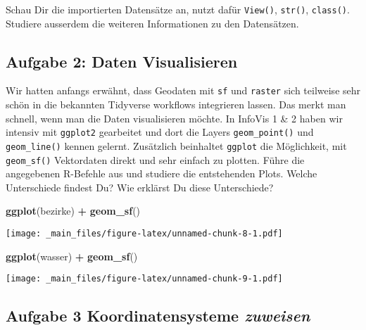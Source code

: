 \documentclass[]{book}
\newenvironment{Shaded}{\begin{snugshade}}{\end{snugshade}}
\newcommand{\KeywordTok}[1]{\textcolor[rgb]{0.13,0.29,0.53}{\textbf{#1}}}
\newcommand{\NormalTok}[1]{#1}
\newcommand{\OperatorTok}[1]{\textcolor[rgb]{0.81,0.36,0.00}{\textbf{#1}}}
\newcommand{\StringTok}[1]{\textcolor[rgb]{0.31,0.60,0.02}{#1}}
\begin{document}
Schau Dir die importierten Datensätze an, nutzt dafür \texttt{View()}, \texttt{str()}, \texttt{class()}. Studiere ausserdem die weiteren Informationen zu den Datensätzen.

\hypertarget{aufgabe-2-daten-visualisieren}{%
\subsection{Aufgabe 2: Daten Visualisieren}\label{aufgabe-2-daten-visualisieren}}

Wir hatten anfangs erwähnt, dass Geodaten mit \texttt{sf} und \texttt{raster} sich teilweise sehr schön in die bekannten Tidyverse workflows integrieren lassen. Das merkt man schnell, wenn man die Daten visualisieren möchte. In InfoVis 1 \& 2 haben wir intensiv mit \texttt{ggplot2} gearbeitet und dort die Layers \texttt{geom\_point()} und \texttt{geom\_line()} kennen gelernt. Zusätzlich beinhaltet \texttt{ggplot} die Möglichkeit, mit \texttt{geom\_sf()} Vektordaten direkt und sehr einfach zu plotten. Führe die angegebenen R-Befehle aus und studiere die entstehenden Plots. Welche Unterschiede findest Du? Wie erklärst Du diese Unterschiede?

\begin{Shaded}
\begin{Highlighting}[]
\KeywordTok{ggplot}\NormalTok{(bezirke) }\OperatorTok{+}\StringTok{ }
\StringTok{  }\KeywordTok{geom_sf}\NormalTok{()}
\end{Highlighting}
\end{Shaded}

\texttt{[image: \_main\_files/figure-latex/unnamed-chunk-8-1.pdf]}

\begin{Shaded}
\begin{Highlighting}[]
\KeywordTok{ggplot}\NormalTok{(wasser) }\OperatorTok{+}\StringTok{ }
\StringTok{  }\KeywordTok{geom_sf}\NormalTok{()}
\end{Highlighting}
\end{Shaded}

\texttt{[image: \_main\_files/figure-latex/unnamed-chunk-9-1.pdf]}

\hypertarget{aufgabe-3-koordinatensysteme-zuweisen}{%
\subsection{\texorpdfstring{Aufgabe 3 Koordinatensysteme \emph{zuweisen}}{Aufgabe 3 Koordinatensysteme zuweisen}}\label{aufgabe-3-koordinatensysteme-zuweisen}}
\end{document}
